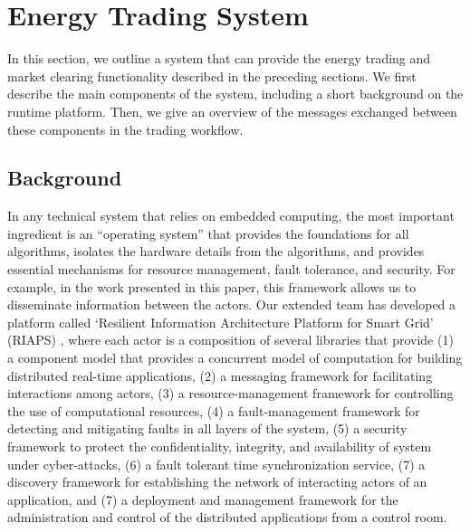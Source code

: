 



\section{Energy Trading System}
\label{sec:tradingsystem}



In this section, we outline a system that can provide the energy trading and market clearing functionality described in the preceding sections. We first describe the main components of the system, including a short background on the runtime platform. 
Then, we give an overview of the messages exchanged between these components in the trading workflow. 





\subsection{Background}

In any technical system that relies on embedded computing, the most important ingredient is an ``operating system'' that provides the foundations for all algorithms, isolates the hardware details from the algorithms, and provides essential mechanisms for resource management, fault tolerance, and security. For example, in the work presented in this paper, this framework allows us to disseminate information between the actors. Our extended team has developed a platform called `Resilient Information Architecture Platform for Smart Grid' (RIAPS) \cite{riaps}, where each actor is a composition of several libraries that provide (1) a component model that provides a concurrent model of computation for building distributed real-time applications, (2) a messaging framework for facilitating interactions among actors, (3) a resource-management framework for controlling the use of computational resources, (4) a fault-management framework for detecting and mitigating faults in all layers of the system, (5) a security framework to protect the confidentiality, integrity, and availability of system under cyber-attacks, (6) a fault tolerant time synchronization service,  (7) a discovery framework for establishing the network of interacting actors of an application, and (7) a deployment and management framework for the administration and control of the distributed applications from a control room. 









